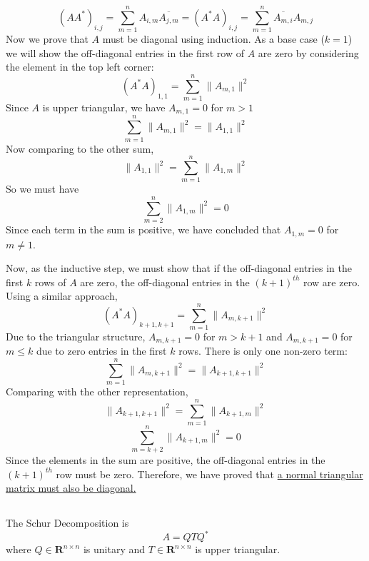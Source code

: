 \documentclass[11pt]{article} %
\begin{document}
\begin{equation}
(AA^{*})_{i,j}= \sum_{m=1}^n A_{i,m} \overline{A_{j,m}}  = (A^*A)_{i,j}= \sum_{m=1}^n \overline{A_{m,i}} A_{m,j} 
\end{equation}
Now we prove that $A$ must be diagonal using induction. As a base case ($k=1$) we will show the off-diagonal entries in the first row of $A$ are zero by considering the element in the top left corner:
\begin{equation}
(A^*A)_{1,1}= \sum_{m=1}^n \| A_{m,1}\|^2
\end{equation}
Since $A$ is upper triangular, we have $A_{m,1}=0$ for $m >1$
\begin{equation}
 \sum_{m=1}^n \| A_{m,1}\|^2  = \|A_{1,1}\|^2
\end{equation}
Now comparing to the other sum,
\begin{equation}
 \|A_{1,1}\|^2= \sum_{m=1}^n \|A_{1,m}\|^2
\end{equation}
So we must have
\begin{equation}
\sum_{m=2}^n \|A_{1,m}\|^2 = 0
\end{equation}
Since each term in the sum is positive, we have concluded that $A_{1,m}=0$ for $m \ne 1$.

Now, as the inductive step, we must show that if the off-diagonal entries in the first $k$ rows of $A$ are zero, the off-diagonal entries in the $(k+1)^{th}$ row are zero. Using a similar approach,
\begin{equation}
(A^*A)_{k+1,k+1}= \sum_{m=1}^n  \|A_{m,k+1} \|^2
\end{equation}
Due to the triangular structure, $A_{m,k+1}=0$ for $m > k+1$ and $A_{m,k+1} = 0$ for $m\le k$ due to zero entries in the first $k$ rows. There is only one non-zero term:
\begin{equation}
\sum_{m=1}^n  \|A_{m,k+1} \|^2 = \|A_{k+1,k+1}\|^2
\end{equation}
Comparing with the other representation,
\begin{equation}
 \|A_{k+1,k+1}\|^2= \sum_{m=1}^n \|A_{k+1,m}\|^2
\end{equation}
\begin{equation}
\sum_{m=k+2}^n \|A_{k+1,m}\|^2 = 0
\end{equation}
Since the elements in the sum are positive, the off-diagonal entries in the $(k+1)^{th}$ row must be zero. Therefore, we have proved that \uline{a normal triangular matrix must also be diagonal.}
\subsection{} %
The Schur Decomposition is
\begin{equation}
A = Q T Q^*
\end{equation}
where $Q \in \mathbf{R}^{n \times n}$ is unitary and $T \in \mathbf{R}^{n \times n}$ is upper triangular.
\end{document}

